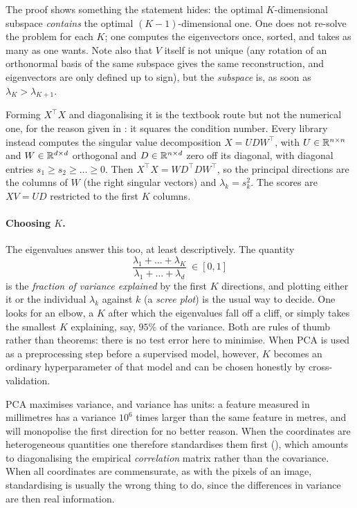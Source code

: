\begin{remark}
The proof shows something the statement hides: the optimal $K$-dimensional subspace
\emph{contains} the optimal $(K-1)$-dimensional one. One does not re-solve the problem
for each $K$; one computes the eigenvectors once, sorted, and takes as many as one
wants. Note also that $V$ itself is not unique (any rotation of an orthonormal basis of
the same subspace gives the same reconstruction, and eigenvectors are only defined up
to sign), but the \emph{subspace} is, as soon as $\lambda_K > \lambda_{K+1}$.
\end{remark}

\begin{remark}
Forming $X^\top X$ and diagonalising it is the textbook route but not the numerical one,
for the reason given in : it squares the condition number. Every
library instead computes the singular value decomposition $X = U D W^\top$, with $U \in
\mathbb{R}^{n \times n}$ and $W \in \mathbb{R}^{d \times d}$ orthogonal and $D \in \mathbb{R}^{n \times d}$ zero
off its diagonal, with diagonal entries $s_1 \geq s_2 \geq \dots \geq 0$. Then $X^\top X = W D^\top D W^\top$, so the principal
directions are the columns of $W$ (the right singular vectors) and $\lambda_k = s_k^2$.
The scores are $XV = U D$ restricted to the first $K$ columns.
\end{remark}

\paragraph{Choosing $K$.}
The eigenvalues answer this too, at least descriptively. The quantity
\[
\frac{\lambda_1 + \dots + \lambda_K}{\lambda_1 + \dots + \lambda_d} \ \in [0, 1]
\]
is the \emph{fraction of variance explained} by the first $K$ directions, and plotting
either it or the individual $\lambda_k$ against $k$ (a \emph{scree plot}) is the usual
way to decide. One looks for an elbow, a $K$ after which the eigenvalues fall off a
cliff, or simply takes the smallest $K$ explaining, say, $95\%$ of the variance. Both
are rules of thumb rather than theorems: there is no test error here to minimise. When
PCA is used as a preprocessing step before a supervised model, however, $K$ becomes an
ordinary hyperparameter of that model and can be chosen honestly by cross-validation.

\begin{remark}
PCA maximises variance, and variance has units: a feature measured in
millimetres has a variance $10^6$ times larger than the same feature in metres, and
will monopolise the first direction for no better reason. When the coordinates are
heterogeneous quantities one therefore standardises them first
(), which amounts to diagonalising the empirical
\emph{correlation} matrix rather than the covariance. When all coordinates are
commensurate, as with the pixels of an image, standardising is usually the wrong thing
to do, since the differences in variance are then real information.
\end{remark}

